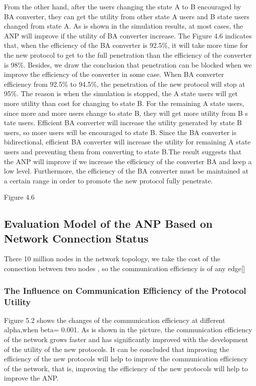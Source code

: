 \documentclass{article}
\begin{document}
From the other hand, after the users changing the state A to B encouraged by BA converter, they can get the utility from
other state A users and  B state users changed from state A. As is shown in the simulation results, at most cases,
the ANP will improve if the utility of BA converter increase. The Figure 4.6 indicates that, when the efficiency of
the BA converter is 92.5\%, it will take more time for the new protocol to get to the full penetration than the efficiency of
the converter is 98\%. Besides, we draw the conclusion that penetration can be blocked when we improve the efficiency of
the converter in some case. When BA converter efficiency from 92.5\% to 94.5\%,  the penetration of the new protocol will
stop at 95\%. The reason is when the simulation is stopped, the A state users will get more utility than cost for changing
to state B. For the remaining A state users, since more and more users change to state B, they will get more utility from B s
tate users.   Efficient BA converter will increase the utility generated by state B users, so more users will be encouraged to
state B. Since the BA converter is bidirectional, efficient BA converter will increase the utility for remaining A state users
and preventing them from converting to state B.The result suggests that the ANP will improve if we increase the efficiency of
the converter BA and keep a low level. Furthermore, the efficiency of the BA converter must be maintained at a certain range
in order to promote the new protocol fully penetrate.

Figure 4.6

\subsection{Evaluation Model of the ANP Based on Network Connection Status}
There 10 million nodes in the network topology, we take the cost of the connection between two nodes , so the communication
efficiency is of any edge[]
\subsubsection{The Influence on Communication Efficiency  of the Protocol Utility}
Figure 5.2 shows the changes of the communication efficiency at different alpha,when beta= 0.001. As is shown in the picture,
the communication efficiency of the network grows faster and has significantly improved with the development of the utility
of the new protocols. It can be concluded that improving the efficiency of the new protocols will help to improve the communication
efficiency of the network, that is, improving the efficiency of the new protocols will help to improve the ANP.
\end{document}
